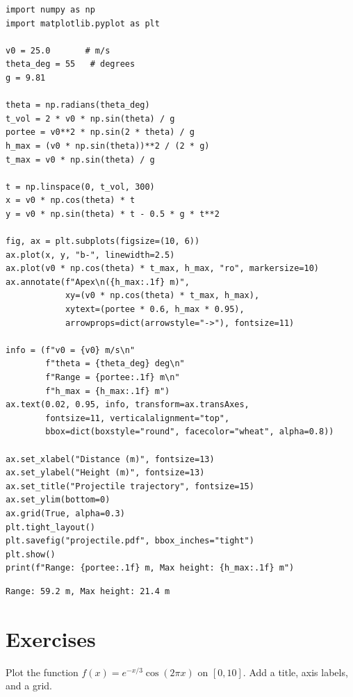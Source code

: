 \begin{codeblock}[title=\textbf{Python}]
\begin{verbatim}
import numpy as np
import matplotlib.pyplot as plt

v0 = 25.0       # m/s
theta_deg = 55   # degrees
g = 9.81

theta = np.radians(theta_deg)
t_vol = 2 * v0 * np.sin(theta) / g
portee = v0**2 * np.sin(2 * theta) / g
h_max = (v0 * np.sin(theta))**2 / (2 * g)
t_max = v0 * np.sin(theta) / g

t = np.linspace(0, t_vol, 300)
x = v0 * np.cos(theta) * t
y = v0 * np.sin(theta) * t - 0.5 * g * t**2

fig, ax = plt.subplots(figsize=(10, 6))
ax.plot(x, y, "b-", linewidth=2.5)
ax.plot(v0 * np.cos(theta) * t_max, h_max, "ro", markersize=10)
ax.annotate(f"Apex\n({h_max:.1f} m)",
            xy=(v0 * np.cos(theta) * t_max, h_max),
            xytext=(portee * 0.6, h_max * 0.95),
            arrowprops=dict(arrowstyle="->"), fontsize=11)

info = (f"v0 = {v0} m/s\n"
        f"theta = {theta_deg} deg\n"
        f"Range = {portee:.1f} m\n"
        f"h_max = {h_max:.1f} m")
ax.text(0.02, 0.95, info, transform=ax.transAxes,
        fontsize=11, verticalalignment="top",
        bbox=dict(boxstyle="round", facecolor="wheat", alpha=0.8))

ax.set_xlabel("Distance (m)", fontsize=13)
ax.set_ylabel("Height (m)", fontsize=13)
ax.set_title("Projectile trajectory", fontsize=15)
ax.set_ylim(bottom=0)
ax.grid(True, alpha=0.3)
plt.tight_layout()
plt.savefig("projectile.pdf", bbox_inches="tight")
plt.show()
print(f"Range: {portee:.1f} m, Max height: {h_max:.1f} m")
\end{verbatim}
\end{codeblock}

\begin{codeoutput}
\begin{verbatim}
Range: 59.2 m, Max height: 21.4 m
\end{verbatim}
\end{codeoutput}

\section{Exercises}

\begin{exercise}
Plot the function $f(x) = e^{-x/3} \cos(2\pi x)$ on $[0, 10]$.
Add a title, axis labels, and a grid.
\end{exercise}

